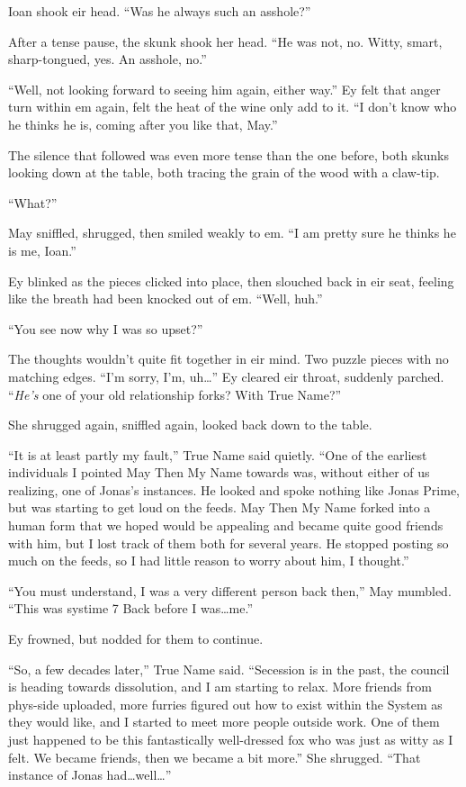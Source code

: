 Ioan shook eir head. ``Was he always such an asshole?''

After a tense pause, the skunk shook her head. ``He was not, no. Witty, smart, sharp-tongued, yes. An asshole, no.''

``Well, not looking forward to seeing him again, either way.'' Ey felt that anger turn within em again, felt the heat of the wine only add to it. ``I don't know who he thinks he is, coming after you like that, May.''

The silence that followed was even more tense than the one before, both skunks looking down at the table, both tracing the grain of the wood with a claw-tip.

``What?''

May sniffled, shrugged, then smiled weakly to em. ``I am pretty sure he thinks he is me, Ioan.''

Ey blinked as the pieces clicked into place, then slouched back in eir seat, feeling like the breath had been knocked out of em. ``Well, huh.''

``You see now why I was so upset?''

The thoughts wouldn't quite fit together in eir mind. Two puzzle pieces with no matching edges. ``I'm sorry, I'm, uh\ldots{}'' Ey cleared eir throat, suddenly parched. ``\emph{He's} one of your old relationship forks? With True Name?''

She shrugged again, sniffled again, looked back down to the table.

``It is at least partly my fault,'' True Name said quietly. ``One of the earliest individuals I pointed May Then My Name towards was, without either of us realizing, one of Jonas's instances. He looked and spoke nothing like Jonas Prime, but was starting to get loud on the feeds. May Then My Name forked into a human form that we hoped would be appealing and became quite good friends with him, but I lost track of them both for several years. He stopped posting so much on the feeds, so I had little reason to worry about him, I thought.''

``You must understand, I was a very different person back then,'' May mumbled. ``This was systime 7 Back before I was\ldots me.''

Ey frowned, but nodded for them to continue.

``So, a few decades later,'' True Name said. ``Secession is in the past, the council is heading towards dissolution, and I am starting to relax. More friends from phys-side uploaded, more furries figured out how to exist within the System as they would like, and I started to meet more people outside work. One of them just happened to be this fantastically well-dressed fox who was just as witty as I felt. We became friends, then we became a bit more.'' She shrugged. ``That instance of Jonas had\ldots well\ldots{}''


